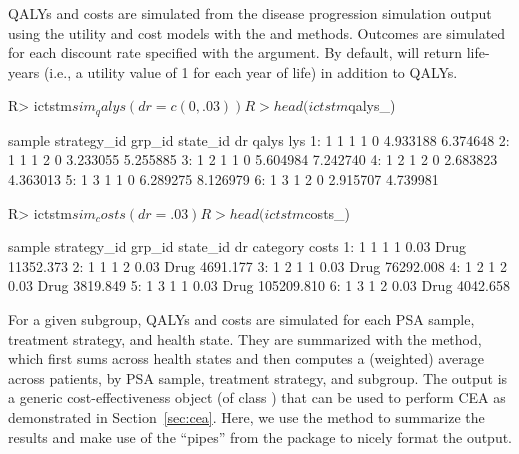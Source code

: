 \documentclass[article, nojss]{jss}\usepackage[]{graphicx}\usepackage[]{color}
\begin{document}
QALYs and costs are simulated from the disease progression simulation output using the utility and cost models with the  and  methods. Outcomes are simulated for each discount rate specified with the  argument. By default,  will return life-years (i.e., a utility value of 1 for each year of life) in addition to QALYs. 

\begin{Schunk}
\begin{Sinput}
R> ictstm$sim_qalys(dr = c(0,.03))
R> head(ictstm$qalys_)
\end{Sinput}
\begin{Soutput}
   sample strategy_id grp_id state_id dr    qalys      lys
1:      1           1      1        1  0 4.933188 6.374648
2:      1           1      1        2  0 3.233055 5.255885
3:      1           2      1        1  0 5.604984 7.242740
4:      1           2      1        2  0 2.683823 4.363013
5:      1           3      1        1  0 6.289275 8.126979
6:      1           3      1        2  0 2.915707 4.739981
\end{Soutput}
\end{Schunk}

\begin{Schunk}
\begin{Sinput}
R> ictstm$sim_costs(dr = .03)
R> head(ictstm$costs_)
\end{Sinput}
\begin{Soutput}
   sample strategy_id grp_id state_id   dr category      costs
1:      1           1      1        1 0.03     Drug  11352.373
2:      1           1      1        2 0.03     Drug   4691.177
3:      1           2      1        1 0.03     Drug  76292.008
4:      1           2      1        2 0.03     Drug   3819.849
5:      1           3      1        1 0.03     Drug 105209.810
6:      1           3      1        2 0.03     Drug   4042.658
\end{Soutput}
\end{Schunk}

For a given subgroup, QALYs and costs are simulated for each PSA sample, treatment strategy, and health state. They are summarized with the  method, which first sums across health states and then computes a (weighted) average across patients, by PSA sample, treatment strategy, and subgroup. The output is a generic cost-effectiveness object (of class ) that can be used to perform CEA as demonstrated in Section~\ref{sec:cea}. Here, we use the  method to summarize the results and make use of the ``pipes'' from the  \citep{bache2020} package to nicely format the output. 
\end{document}
